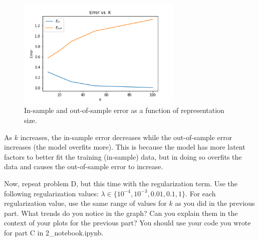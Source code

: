 \begin{solution}
    \begin{figure}[H]
    \begin{center}
        \includegraphics[width=0.7\textwidth]{plots/2d.png}
        \caption{In-sample and out-of-sample error as a function of representation size.}
    \end{center}
    \end{figure}
    As $k$ increases, the in-sample error decreases while the out-of-sample error increases (the model overfits more). This is because the model has more latent factors to better fit the training (in-sample) data, but in doing so overfits the data and causes the out-of-sample error to increase.
\end{solution}

\newpage

\problem[5]
Now, repeat problem D, but this time with the regularization term. Use the following regularization values: $\lambda \in \{10^{-4}, 10^{-3}, 0.01, 0.1, 1\}$. For each regularization value, use the same range of values for $k$ as you did in the previous part. What trends do you notice in the graph? Can you explain them in the context of your plots for the previous part? You should use your code you wrote for part C in 2_notebook.ipynb.

